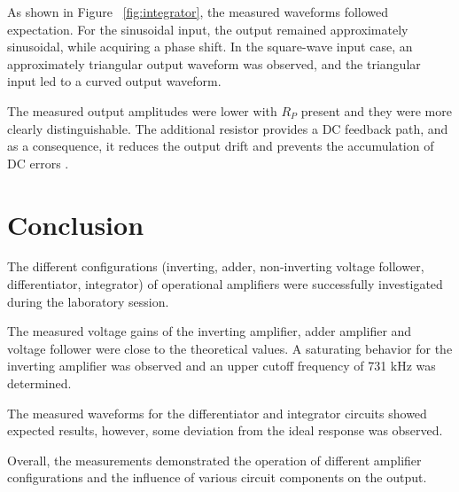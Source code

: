 \documentclass[12pt]{article}
\begin{document}
As shown in Figure ~\ref{fig:integrator}, the measured waveforms followed expectation. For the sinusoidal input, the output remained approximately sinusoidal, while acquiring a phase shift. In the square-wave input case, an approximately triangular output waveform was observed, and the triangular input led to a curved output waveform. 

The measured output amplitudes were lower with $R_P$ present and they were more clearly distinguishable. The additional resistor provides a DC feedback path, and as a consequence, it reduces the output drift and prevents the accumulation of DC errors \cite{TI_integrator}. 
\section{Conclusion}
The different configurations (inverting, adder, non-inverting voltage follower, differentiator, integrator) of operational amplifiers were successfully investigated during the laboratory session.

The measured voltage gains of the inverting amplifier, adder amplifier and voltage follower were close to the theoretical values. A saturating behavior for the inverting amplifier was observed and an upper cutoff frequency of 731 kHz was determined. 

The measured waveforms for the differentiator and integrator circuits showed expected results, however, some deviation from the ideal response was observed. 

Overall, the measurements demonstrated the operation of different amplifier configurations and the influence of various circuit components on the output. 

\nocite{*}
\printbibliography 
\end{document}
